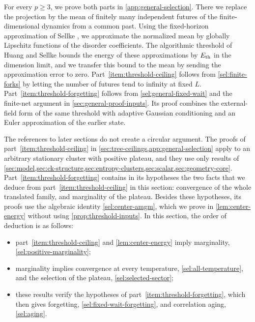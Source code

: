 For every $p\ge3$, we prove both parts in \cref{app:general-selection}. There we replace the projection by the mean of finitely many independent futures of the finite-dimensional dynamics from a common past. Using the fixed-horizon approximation of Sellke \cite[Lemmas~3.1--3.2]{sellke2024}, we approximate the normalized mean by globally Lipschitz functions of the disorder coefficients. The algorithmic threshold of Huang and Sellke \cite[Theorem~1 and Corollary~1.8]{hs2023} bounds the energy of these approximations by $E_{\mathrm{th}}$ in the dimension limit, and we transfer this bound to the mean by sending the approximation error to zero. Part~\ref{item:threshold-ceiling} follows from \cref{sel:finite-forks} by letting the number of futures tend to infinity at fixed $L$. Part~\ref{item:threshold-forgetting} follows from \cref{sel:general-fixed-wait} and the finite-net argument in \cref{sec:general-proof-inputs}. Its proof combines the external-field form of the same threshold with adaptive Gaussian conditioning and an Euler approximation of the earlier state.

The references to later sections do not create a circular argument. The proofs of part~\ref{item:threshold-ceiling} in \cref{sec:tree-ceilings,app:general-selection} apply to an arbitrary stationary cluster with positive plateau, and they use only results of \cref{sec:model,sec:ck-structure,sec:entropy-clusters,sec:scalar,sec:geometry-core}. Part~\ref{item:threshold-forgetting} contains in its hypotheses the two facts that we deduce from part~\ref{item:threshold-ceiling} in this section: convergence of the whole translated family, and marginality of the plateau. Besides these hypotheses, its proofs use the algebraic identity \eqref{sel:center-amgm}, which we prove in \cref{lem:center-energy} without using \cref{prop:threshold-inputs}. In this section, the order of deduction is as follows:
\begin{itemize}
\item part~\ref{item:threshold-ceiling} and \cref{lem:center-energy} imply marginality, \cref{sel:positive-marginality};
\item marginality implies convergence at every temperature, \cref{sel:all-temperature}, and the selection of the plateau, \cref{sel:selected-sector};
\item these results verify the hypotheses of part~\ref{item:threshold-forgetting}, which then gives forgetting, \cref{sel:fixed-wait-forgetting}, and correlation aging, \cref{sel:aging}.
\end{itemize}

